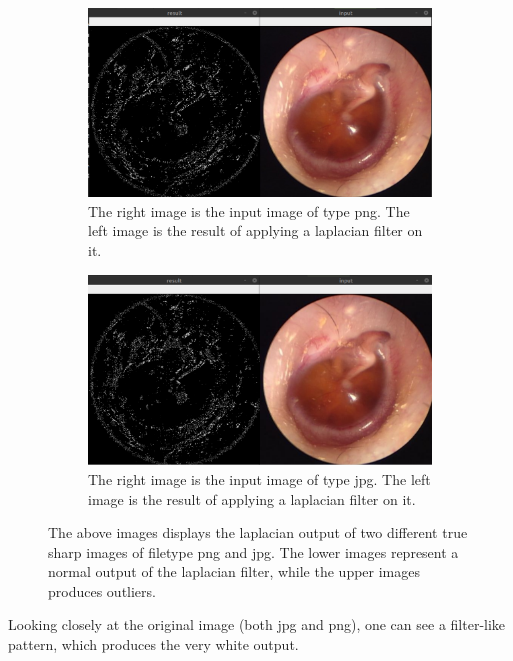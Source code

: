\begin{figure}[H]
    \begin{subfigure}[t]{0.48\textwidth}
	    \includegraphics[width=\textwidth]{Figures/lv/out_29_png.png}
	    \caption{The right image is the input image of type png. The left image is the result of applying a laplacian filter on it.}
    \end{subfigure}\hspace{1em}
    \begin{subfigure}[t]{0.48\textwidth}
    		\includegraphics[width=\textwidth]{Figures/lv/out_29_jpg.png}
    		\caption{The right image is the input image of type jpg. The left image is the result of applying a laplacian filter on it.}
    \end{subfigure}\hspace{1em}
    \caption{The above images displays the laplacian output of two different true sharp images of filetype png and jpg. The lower images represent a normal output of the laplacian filter, while the upper images produces outliers.}
    \label{fig:LV_very_sharp}
\end{figure}

Looking closely at the original image (both jpg and png), one can see a filter-like pattern, which produces the very white output.

